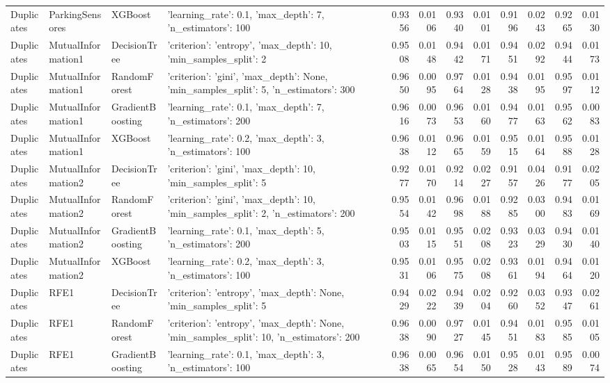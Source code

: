 \begin{tabular}{llllrrrrrrrr}
Duplicates & ParkingSensores & XGBoost & {'learning_rate': 0.1, 'max_depth': 7, 'n_estimators': 100} & 0.9356 & 0.0106 & 0.9340 & 0.0101 & 0.9196 & 0.0243 & 0.9265 & 0.0130 \\
Duplicates & MutualInformation1 & DecisionTree & {'criterion': 'entropy', 'max_depth': 10, 'min_samples_split': 2} & 0.9508 & 0.0148 & 0.9442 & 0.0171 & 0.9451 & 0.0292 & 0.9444 & 0.0173 \\
Duplicates & MutualInformation1 & RandomForest & {'criterion': 'gini', 'max_depth': None, 'min_samples_split': 5, 'n_estimators': 300} & 0.9650 & 0.0095 & 0.9764 & 0.0128 & 0.9438 & 0.0195 & 0.9597 & 0.0112 \\
Duplicates & MutualInformation1 & GradientBoosting & {'learning_rate': 0.1, 'max_depth': 7, 'n_estimators': 200} & 0.9616 & 0.0073 & 0.9653 & 0.0160 & 0.9477 & 0.0163 & 0.9562 & 0.0083 \\
Duplicates & MutualInformation1 & XGBoost & {'learning_rate': 0.2, 'max_depth': 3, 'n_estimators': 100} & 0.9638 & 0.0112 & 0.9665 & 0.0159 & 0.9515 & 0.0164 & 0.9588 & 0.0128 \\
Duplicates & MutualInformation2 & DecisionTree & {'criterion': 'gini', 'max_depth': 10, 'min_samples_split': 5} & 0.9277 & 0.0170 & 0.9214 & 0.0227 & 0.9157 & 0.0426 & 0.9177 & 0.0205 \\
Duplicates & MutualInformation2 & RandomForest & {'criterion': 'gini', 'max_depth': 10, 'min_samples_split': 2, 'n_estimators': 200} & 0.9554 & 0.0142 & 0.9698 & 0.0188 & 0.9285 & 0.0300 & 0.9483 & 0.0169 \\
Duplicates & MutualInformation2 & GradientBoosting & {'learning_rate': 0.1, 'max_depth': 5, 'n_estimators': 200} & 0.9503 & 0.0115 & 0.9551 & 0.0208 & 0.9323 & 0.0329 & 0.9430 & 0.0140 \\
Duplicates & MutualInformation2 & XGBoost & {'learning_rate': 0.2, 'max_depth': 3, 'n_estimators': 100} & 0.9531 & 0.0106 & 0.9575 & 0.0208 & 0.9361 & 0.0194 & 0.9464 & 0.0120 \\
Duplicates & RFE1 & DecisionTree & {'criterion': 'entropy', 'max_depth': None, 'min_samples_split': 5} & 0.9429 & 0.0222 & 0.9439 & 0.0204 & 0.9260 & 0.0352 & 0.9347 & 0.0261 \\
Duplicates & RFE1 & RandomForest & {'criterion': 'entropy', 'max_depth': None, 'min_samples_split': 10, 'n_estimators': 200} & 0.9638 & 0.0090 & 0.9727 & 0.0145 & 0.9451 & 0.0183 & 0.9585 & 0.0105 \\
Duplicates & RFE1 & GradientBoosting & {'learning_rate': 0.1, 'max_depth': 3, 'n_estimators': 100} & 0.9638 & 0.0065 & 0.9654 & 0.0150 & 0.9528 & 0.0143 & 0.9589 & 0.0074 \\

\end{tabular}

